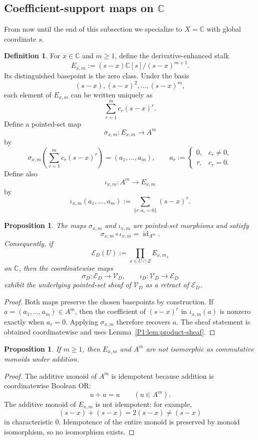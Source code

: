 \documentclass[11pt,a4paper]{article}
\numberwithin{equation}{section}
\newtheorem{proposition}[theorem]{Proposition}
\theoremstyle{definition}
\newtheorem{definition}[theorem]{Definition}
\theoremstyle{remark}
\newcommand{\CC}{\mathbb C}
\newcommand{\cV}{\mathcal V}
\newcommand{\cE}{\mathcal E}
\newcommand{\taup}{\tau}
\begin{document}
\subsection{Coefficient-support maps on $\CC$}

From now until the end of this subsection we specialize to $X=\CC$ with global coordinate $s$.

\begin{definition}
For $x\in\CC$ and $m\ge1$, define the derivative-enhanced stalk
\[
E_{x,m}:=(s-x)\CC[s]/(s-x)^{m+1}.
\]
Its distinguished basepoint is the zero class.  Under the basis
\[
(s-x),(s-x)^2,\dots,(s-x)^m,
\]
each element of $E_{x,m}$ can be written uniquely as
\[
\sum_{r=1}^m c_r(s-x)^r.
\]
Define a pointed-set map
\[
\sigma_{x,m}:E_{x,m}\to A^m
\]
by
\[
\sigma_{x,m}\!\left(\sum_{r=1}^m c_r(s-x)^r\right)=(a_1,\dots,a_m),
\qquad
 a_r:=\begin{cases}0,& c_r\neq0,\\ \taup,& c_r=0.\end{cases}
\]
Define also
\[
\iota_{x,m}:A^m\to E_{x,m}
\]
by
\[
\iota_{x,m}(a_1,\dots,a_m):=\sum_{\{r:a_r=0\}}(s-x)^r.
\]
\end{definition}

\begin{proposition}\label{P1:prop:pointed-retract}
The maps $\sigma_{x,m}$ and $\iota_{x,m}$ are pointed-set morphisms and satisfy
\[
\sigma_{x,m}\circ\iota_{x,m}=\operatorname{id}_{A^m}.
\]
Consequently, if
\[
\cE_D(U):=\prod_{x\in U\cap Z}E_{x,m_x}
\]
on $\CC$, then the coordinatewise maps
\[
\sigma_D:\cE_D\to\cV_D,
\qquad
\iota_D:\cV_D\to\cE_D
\]
exhibit the underlying pointed-set sheaf of $\cV_D$ as a retract of $\cE_D$.
\end{proposition}

\begin{proof}
Both maps preserve the chosen basepoints by construction.  If $a=(a_1,\dots,a_m)\in A^m$, then the coefficient of $(s-x)^r$ in $\iota_{x,m}(a)$ is nonzero exactly when $a_r=0$.  Applying $\sigma_{x,m}$ therefore recovers $a$.  The sheaf statement is obtained coordinatewise and uses Lemma~\ref{P1:lem:product-sheaf}.
\end{proof}

\begin{proposition}\label{P1:prop:not-cmon-iso}
If $m\ge1$, then $E_{x,m}$ and $A^m$ are not isomorphic as commutative monoids under addition.
\end{proposition}

\begin{proof}
The additive monoid of $A^m$ is idempotent because addition is coordinatewise Boolean OR:
\[
u+u=u\qquad (u\in A^m).
\]
The additive monoid of $E_{x,m}$ is not idempotent: for example,
\[
(s-x)+(s-x)=2(s-x)\neq (s-x)
\]
in characteristic $0$.  Idempotence of the entire monoid is preserved by monoid isomorphism, so no isomorphism exists.
\end{proof}
\end{document}
